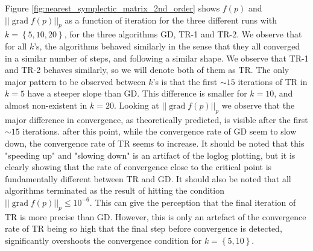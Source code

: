 Figure \ref{fig:nearest_symplectic_matrix_2nd_order} shows $f(p)$ and $\lvert \lvert \operatorname{grad}f(p) \rvert \rvert_{p}$ as a function of iteration for the three different runs with $k=\left\{ 5,10,20 \right\}$, for the three algorithms GD, TR-1 and TR-2. We observe that for all $k$'s, the algorithms behaved similarly in the sense that they all converged in a similar number of steps, and following a similar shape. We observe that TR-1 and TR-2 behaves  similarly, so we will denote both of them as TR. The only major pattern to be observed between $k$'s is that the first $\sim 15$ iterations of TR in $k=5$ have a steeper slope than GD. This difference is smaller for $k=10$, and almost non-existent in $k=20$. Looking at $\lvert \lvert \operatorname{grad}f(p) \rvert \rvert_{p}$ we observe that the major difference in convergence, as theoretically predicted, is visible after the first $\sim 15$ iterations. after this point, while the convergence rate of GD seem to slow down, the convergence rate of TR seems to increase. It should be noted that this "speeding up" and "slowing down" is an artifact of the loglog plotting, but it is clearly showing that the rate of convergence close to the critical point is fundamentally different between TR and GD. It should also be noted that all algorithms terminated as the result of hitting the condition $\lvert \lvert \operatorname{grad}f(p) \rvert \rvert_{p}\leq10^{-6}$. This can give the perception that the final iteration of TR is more precise than GD. However, this is only an artefact of the convergence rate of TR being so high that the final step before convergence is detected, significantly overshoots the convergence condition for $k=\left\{ 5,10 \right\}$. 

